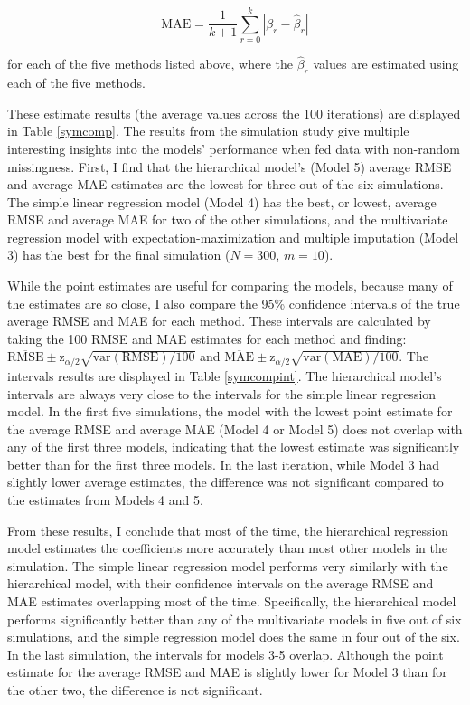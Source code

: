 \begin{equation}
\text{MAE} = \frac{1}{k+1}\sum_{r=0}^{k} |\beta_r - \hat{\beta}_r|
\end{equation}

for each of the five methods listed above, where the $\hat{\beta}_r$ values are estimated using each of the five methods.

These estimate results (the average values across the 100 iterations) are displayed in Table \ref{symcomp}. The results from the simulation study give multiple interesting insights into the models' performance when fed data with non-random missingness. First, I find that the hierarchical model's (Model 5) average RMSE and average MAE estimates are the lowest for three out of the six simulations. The simple linear regression model (Model 4) has the best, or lowest, average RMSE and average MAE for two of the other simulations, and the multivariate regression model with expectation-maximization and multiple imputation (Model 3) has the best for the final simulation ($N=300$, $m=10$). 

While the point estimates are useful for comparing the models, because many of the estimates are so close, I also compare the 95\% confidence intervals of the true average RMSE and MAE for each method. These intervals are calculated by taking the 100 RMSE and MAE estimates for each method and finding: $\overline{\text{RMSE}} \pm \text{z}_{\alpha/2}\sqrt{\text{var}(\text{RMSE})/100}$ and $\overline{\text{MAE}} \pm \text{z}_{\alpha/2}\sqrt{\text{var}(\text{MAE})/100}$. The intervals results are displayed in Table \ref{symcompint}. The hierarchical model's intervals are always very close to the intervals for the simple linear regression model. In the first five simulations, the model with the lowest point estimate for the average RMSE and average MAE (Model 4 or Model 5) does not overlap with any of the first three models, indicating that the lowest estimate was significantly better than for the first three models. In the last iteration, while Model 3 had slightly lower average estimates, the difference was not significant compared to the estimates from Models 4 and 5. 

From these results, I conclude that most of the time, the hierarchical regression model estimates the coefficients more accurately than most other models in the simulation. The simple linear regression model performs very similarly with the hierarchical model, with their confidence intervals on the average RMSE and MAE estimates overlapping most of the time. Specifically, the hierarchical model performs significantly better than any of the multivariate models in five out of six simulations, and the simple regression model does the same in four out of the six. In the last simulation, the intervals for models 3-5 overlap. Although the point estimate for the average RMSE and MAE is slightly lower for Model 3 than for the other two, the difference is not significant. 

